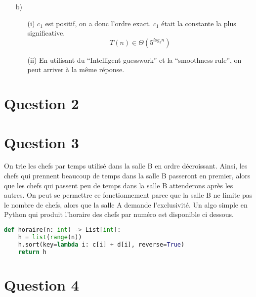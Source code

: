 \documentclass[10pt,letterpaper]{article}
\begin{document}
\begin{enumerate}
		\item[b)]
		
		\begin{enumerate}
			\item[(i)] 
			$c_1$ est positif, on a donc l'ordre exact. $c_1$ était la constante la plus significative.
			$$T(n) \in \Theta(5^{log_3 n})$$
			\item[(ii)] En utilisant du ``Intelligent guesswork'' et la ``smoothness rule'', on peut arriver à la même réponse.
		\end{enumerate}
	\end{enumerate}

	\section*{Question 2}

	\section*{Question 3}
	On trie les chefs par temps utilisé dans la salle B en ordre décroissant. Ainsi, les chefs qui prennent
	beaucoup de temps dans la salle B passeront en premier, alors que les chefs qui passent peu de temps dans la salle B attenderons après les autres. On peut se permettre ce fonctionnement parce que la salle B ne limite pas le nombre de chefs, alors que la salle A demande l'exclusivité. Un algo simple en Python qui produit l'horaire des chefs par numéro est disponible ci dessous.
	\begin{lstlisting}[language=Python]
def horaire(n: int) -> List[int]:
	h = list(range(n))
	h.sort(key=lambda i: c[i] + d[i], reverse=True)
	return h
	\end{lstlisting}	
	\section*{Question 4}
\end{document}
